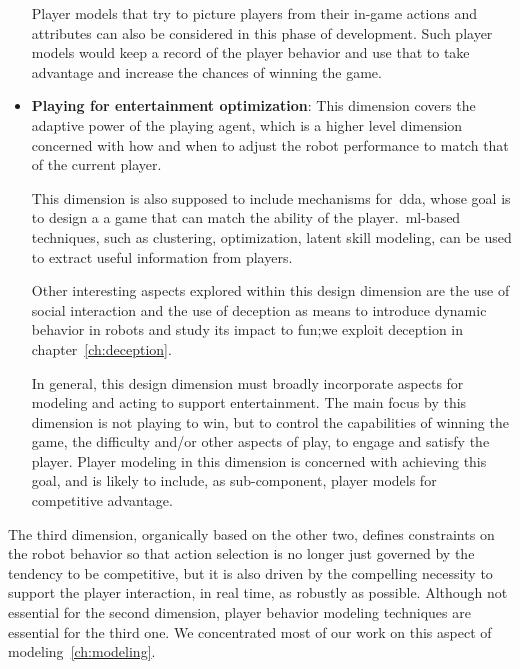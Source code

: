 \begin{itemize}[leftmargin=*,labelsep=5.8mm]
Player models that try to picture players from their in-game actions and attributes can also be considered in this phase of development. Such player models would keep a record of the player behavior and use that to take advantage and increase the chances of winning the game. %

\item \textbf{Playing for entertainment optimization}: This dimension covers the adaptive power of the playing agent, which is a higher level dimension concerned with how and when to adjust the robot performance to match that of the current player. 

This dimension is also supposed to include mechanisms for~\gls{dda}, whose goal is to design a a game that can match the ability of the player.~\gls{ml}-based techniques, such as clustering, optimization, latent skill modeling, can be used to extract useful information from players. 

Other interesting aspects explored within this design dimension are the use of social interaction and the use of deception as means to introduce dynamic behavior in robots and study its impact to fun;we exploit deception in chapter~\ref{ch:deception}.

In general, this design dimension must broadly incorporate aspects for modeling and acting to support entertainment. The main focus by this dimension is not playing to win, but to control the capabilities of winning the game, \ie the difficulty and/or other aspects of play, to engage and satisfy the player. Player modeling in this dimension is concerned with achieving this goal, and is likely to include, as sub-component, player models for competitive advantage.
\end{itemize}

The third dimension, organically based on the other two, defines constraints on the robot behavior so that action selection is no longer just governed by the tendency to be competitive, but it is also driven by the compelling necessity to support the player interaction, in real time, as robustly as possible. %
Although not essential for the second dimension, player behavior modeling techniques are essential for the third one. We concentrated most of our work on this aspect of modeling~\ref{ch:modeling}.

